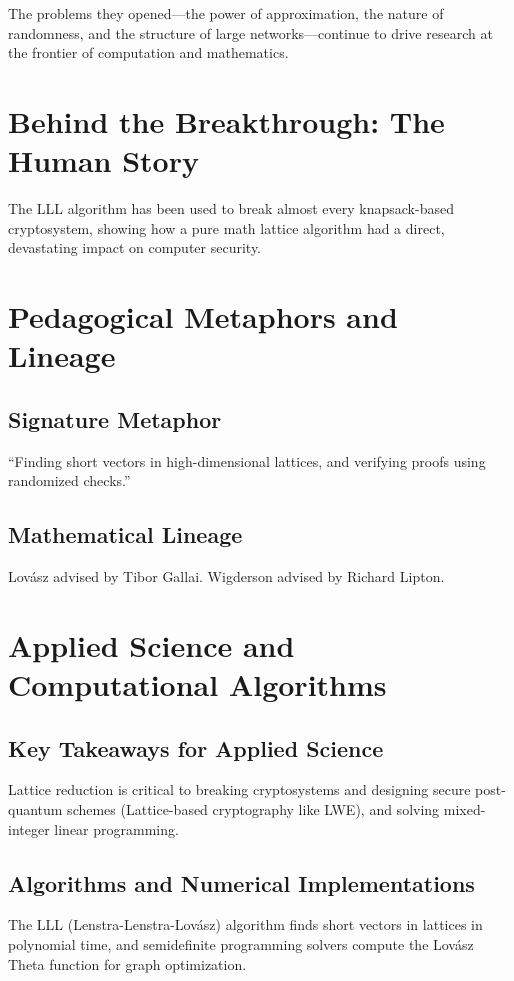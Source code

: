 The problems they opened---the power of approximation, the nature of randomness, and the structure of large networks---continue to drive research at the frontier of computation and mathematics.


\section{Behind the Breakthrough: The Human Story}
The LLL algorithm has been used to break almost every knapsack-based cryptosystem, showing how a pure math lattice algorithm had a direct, devastating impact on computer security.

\section{Pedagogical Metaphors and Lineage}
\subsection{Signature Metaphor}
``Finding short vectors in high-dimensional lattices, and verifying proofs using randomized checks.''

\subsection{Mathematical Lineage}
Lov\'asz advised by Tibor Gallai. Wigderson advised by Richard Lipton.

\section{Applied Science and Computational Algorithms}
\subsection{Key Takeaways for Applied Science}
Lattice reduction is critical to breaking cryptosystems and designing secure post-quantum schemes (Lattice-based cryptography like LWE), and solving mixed-integer linear programming.

\subsection{Algorithms and Numerical Implementations}
The LLL (Lenstra-Lenstra-Lov\'asz) algorithm finds short vectors in lattices in polynomial time, and semidefinite programming solvers compute the Lov\'asz Theta function for graph optimization.

